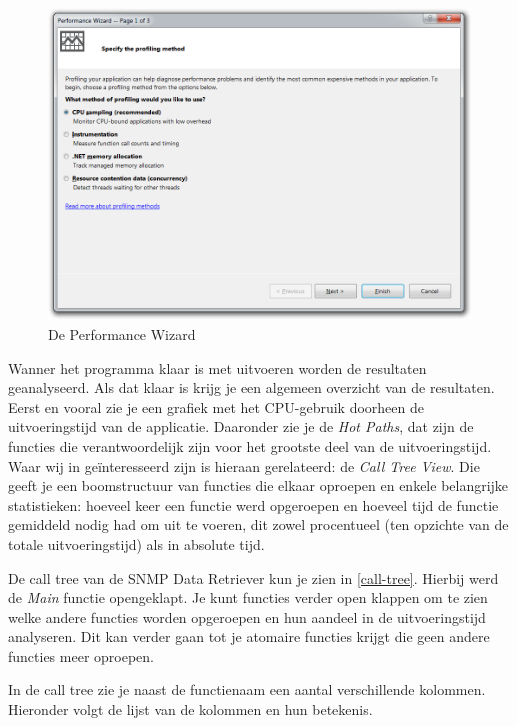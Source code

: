 \begin{figure}[]
	\centering
	\includegraphics[scale=0.50]{figures/profiler/performance-wizard}
	\caption{De Performance Wizard}
	\label{performance-wizard}
\end{figure}

Wanner het programma klaar is met uitvoeren worden de resultaten geanalyseerd.
Als dat klaar is krijg je een algemeen overzicht van de resultaten.
Eerst en vooral zie je een grafiek met het CPU-gebruik doorheen de uitvoeringstijd van de applicatie.
Daaronder zie je de \emph{Hot Paths}, dat zijn de functies die verantwoordelijk zijn voor het grootste deel van de uitvoeringstijd.
Waar wij in geïnteresseerd zijn is hieraan gerelateerd: de \emph{Call Tree View}.
Die geeft je een boomstructuur van functies die elkaar oproepen en enkele belangrijke statistieken:
hoeveel keer een functie werd opgeroepen en hoeveel tijd de functie gemiddeld nodig had om uit te voeren,
dit zowel procentueel (ten opzichte van de totale uitvoeringstijd) als in absolute tijd.

De call tree van de SNMP Data Retriever kun je zien in \cref{call-tree}.
Hierbij werd de \emph{Main} functie opengeklapt. %
Je kunt functies verder open klappen om te zien welke andere functies worden opgeroepen en hun aandeel in de uitvoeringstijd analyseren.
Dit kan verder gaan tot je atomaire functies krijgt die geen andere functies meer oproepen.

In de call tree zie je naast de functienaam een aantal verschillende kolommen. Hieronder volgt de lijst van de kolommen en hun betekenis.

